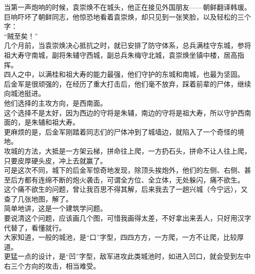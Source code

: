 \begin{multicols}{\theparacolNo}
当第一声炮响的时候，袁崇焕不在城头，他正在接见外国朋友——朝鲜翻译韩瑗。\\

巨响吓坏了朝鲜同志，他惊恐地看着袁崇焕，却只见到一张笑脸，以及轻松的三个字：\\

“贼至矣！”\\

几个月前，当袁崇焕决心抵抗之时，就已安排了防守体系，总兵满桂守东城，参将祖大寿守南城，副将朱辅守西城，副总兵朱梅守北城，袁崇焕坐镇中楼，居高指挥。\\

四人之中，以满桂和祖大寿的能力最强，他们守护的东城和南城，也最为坚固。\\

后金军是很顽强的，在经历了重大打击后，他们毫不放弃，踩着前辈的尸体，继续向城池挺进。\\

他们选择的主攻方向，是西南面。\\

这个选择不是太好，因为西边的守将是朱辅，南边的守将是祖大寿，所以守护西南面的，是朱辅和祖大寿。\\

更麻烦的是，后金军刚踏着同志们的尸体冲到了城墙边，就陷入了一个奇怪的境地。\\

攻城的方法，大抵是一方架云梯，拼命往上爬，一方扔石头，拼命不让人往上爬，只要皮厚硬头皮，冲上去就赢了。\\

可是这次不同，城下的后金军惊奇地发现，除顶头挨炮外，他们的左侧、右侧、甚至后方都有连绵不断的炮火袭击，可谓全方位、全立体，无处躲闪，痛不欲生。\\

这个痛不欲生的问题，曾让我百思不得其解，后来我去了一趟兴城（今宁远），又查了几张地图，解了。\\

简单地讲，这是一个建筑学问题。\\

要说清这个问题，应该画几个图，可惜我画得太差，不好拿出来丢人，只好用汉字代替了，看懂就行。\\

大家知道，一般的城池，是“口”字型，四四方方，一方爬，一方不让爬，比较厚道。\\

更猛一点的设计，是“凹”字型，敌军进攻此类城池时，如进入凹口，就会受到左中右三个方向的攻击，相当难受。\\


\end{multicols}
